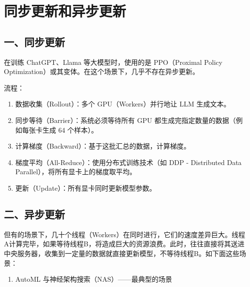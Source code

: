 \clearpage

\hypertarget{ux540cux6b65ux66f4ux65b0ux548cux5f02ux6b65ux66f4ux65b0}{%
\section{同步更新和异步更新}\label{ux540cux6b65ux66f4ux65b0ux548cux5f02ux6b65ux66f4ux65b0}}

\hypertarget{ux4e00ux540cux6b65ux66f4ux65b0}{%
\subsection{一、同步更新}\label{ux4e00ux540cux6b65ux66f4ux65b0}}

在训练 ChatGPT、Llama 等大模型时，使用的是 PPO（Proximal Policy Optimization）或其变体。在这个场景下，几乎不存在异步更新。

流程：

\begin{enumerate}
\def\labelenumi{\arabic{enumi}.}
\tightlist
\item
  数据收集（Rollout）：多个 GPU（Workers）并行地让 LLM 生成文本。
\item
  同步等待（Barrier）：系统必须等待所有 GPU 都生成完指定数量的数据（例如每张卡生成 64 个样本）。
\item
  计算梯度（Backward）：基于这批汇总的数据，计算梯度。
\item
  梯度平均（All-Reduce）：使用分布式训练技术（如 DDP - Distributed Data Parallel），将所有显卡上的梯度取平均。
\item
  更新（Update）：所有显卡同时更新模型参数。
\end{enumerate}

\hypertarget{ux4e8cux5f02ux6b65ux66f4ux65b0}{%
\subsection{二、异步更新}\label{ux4e8cux5f02ux6b65ux66f4ux65b0}}

但有的场景下，几十个线程（Workers）在同时进行，它们的速度差异巨大。线程A计算完毕，如果等待线程B，将造成巨大的资源浪费。此时，往往直接将其送进中央服务器，收集到一定量的数据就直接更新模型，不等待线程B。如下面这些场景：

\begin{enumerate}
\def\labelenumi{\arabic{enumi}.}
\tightlist
\item
  AutoML 与神经架构搜索（NAS）------最典型的场景
\end{enumerate}

